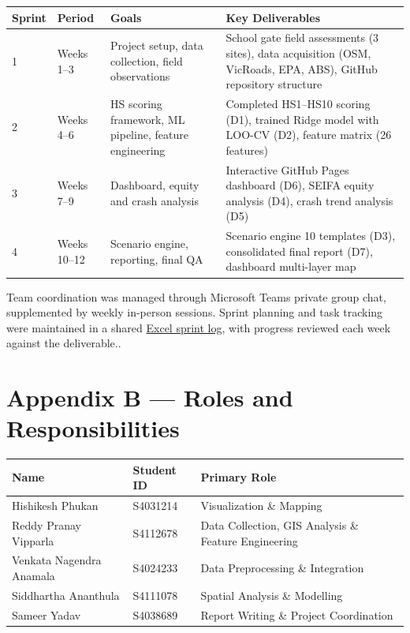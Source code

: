 \documentclass[11pt,a4paper]{article}
\begin{document}
\begin{table}[H]\centering\small
\begin{tabular}{C{1cm}L{2.8cm}L{5cm}L{5.2cm}}
\toprule
\textbf{Sprint} & \textbf{Period} & \textbf{Goals} & \textbf{Key Deliverables} \\
 & Weeks 1--3 & Project setup, data collection, field observations & School gate field assessments (3 sites), data acquisition (OSM, VicRoads, EPA, ABS), GitHub repository structure \\
2 & Weeks 4--6 & HS scoring framework, ML pipeline, feature engineering & Completed HS1--HS10 scoring (D1), trained Ridge model with LOO-CV (D2), feature matrix (26 features) \\
3 & Weeks 7--9 & Dashboard, equity and crash analysis & Interactive GitHub Pages dashboard (D6), SEIFA equity analysis (D4), crash trend analysis (D5) \\
4 & Weeks 10--12 & Scenario engine, reporting, final QA & Scenario engine 10 templates (D3), consolidated final report (D7), dashboard multi-layer map \\
\bottomrule
\end{tabular}
\end{table}

Team coordination was managed through Microsoft Teams private group chat, supplemented by weekly in-person sessions. Sprint planning and task tracking were maintained in a shared \href{https://rmiteduau-my.sharepoint.com/:x:/r/personal/s4031214_student_rmit_edu_au/Documents/300,000%20Streets%20of%20Melbourne/300-000-School-Streets/report/300000%20Streets%20Sprint%20Plan%20(1).xlsx?d=w997040ea2ff24d33a6b38e2b38d76f5d&csf=1&web=1&e=Ghc1eW}{Excel sprint log}, with progress reviewed each week against the deliverable..

\newpage
\section*{Appendix B — Roles and Responsibilities}

\begin{table}[H]\centering\small
\begin{tabular}{L{4.5cm}L{2.5cm}L{7cm}}
\toprule
\textbf{Name} & \textbf{Student ID} & \textbf{Primary Role} \\
\midrule
Hishikesh Phukan & S4031214 & Visualization \& Mapping \\
Reddy Pranay Vipparla & S4112678 & Data Collection, GIS Analysis \& Feature Engineering \\
Venkata Nagendra Anamala & S4024233 & Data Preprocessing \& Integration \\
Siddhartha Ananthula & S4111078 & Spatial Analysis \& Modelling \\
Sameer Yadav & S4038689 & Report Writing \& Project Coordination \\
\bottomrule
\end{tabular}
\end{table}
\end{document}
